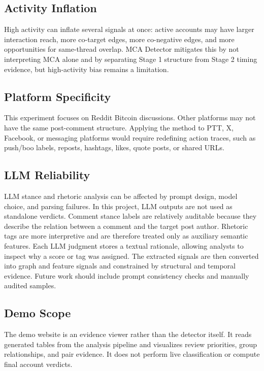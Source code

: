 \documentclass[conference]{IEEEtran}
\begin{document}
\subsection{Activity Inflation}

High activity can inflate several signals at once: active accounts may have
larger interaction reach, more co-target edges, more co-negative edges, and
more opportunities for same-thread overlap. MCA Detector mitigates this by not
interpreting MCA alone and by separating Stage 1 structure from Stage 2 timing
evidence, but high-activity bias remains a limitation.

\subsection{Platform Specificity}

This experiment focuses on Reddit Bitcoin discussions. Other platforms may not
have the same post-comment structure. Applying the method to PTT, X, Facebook,
or messaging platforms would require redefining action traces, such as
push/boo labels, reposts, hashtags, likes, quote posts, or shared URLs.

\subsection{LLM Reliability}

LLM stance and rhetoric analysis can be affected by prompt design, model
choice, and parsing failures. In this project, LLM outputs are not used as
standalone verdicts. Comment stance labels are relatively auditable because
they describe the relation between a comment and the target post author.
Rhetoric tags are more interpretive and are therefore treated only as
auxiliary semantic features. Each LLM judgment stores a textual rationale,
allowing analysts to inspect why a score or tag was assigned. The extracted
signals are then converted into graph and feature signals and constrained by
structural and temporal evidence. Future work should include prompt
consistency checks and manually audited samples.

\subsection{Demo Scope}

The demo website is an evidence viewer rather than the detector itself. It
reads generated tables from the analysis pipeline and visualizes review
priorities, group relationships, and pair evidence. It does not perform live
classification or compute final account verdicts.
\end{document}
